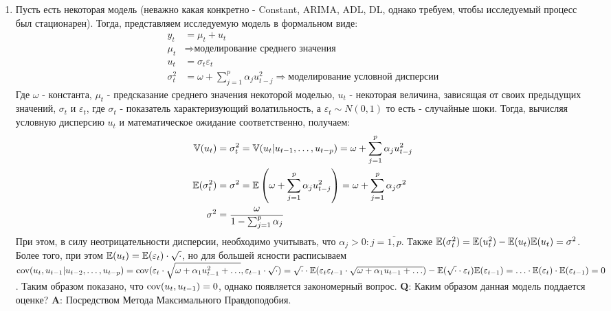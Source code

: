 \begin{enumerate}
	\item Пусть есть некоторая модель (неважно какая конкретно - Constant, ARIMA, ADL, DL, однако требуем, чтобы исследуемый процесс был стационарен). Тогда, представляем исследуемую модель в формальном виде:
	\begin{equation}
		\begin{split}
			y_t & = \mu_t + u_t\\
			\mu_t & \Rightarrow \text{моделирование среднего значения}\\
			u_t & = \sigma_t \varepsilon_t \\
			\sigma_t^2 & = \omega + \sum_{j = 1}^p \alpha_j u_{t - j}^2 \Rightarrow \text{моделирование условной дисперсии}
		\end{split}
	\end{equation}
	Где $\omega$ - константа, $\mu_t$ - предсказание среднего значения некоторой моделью, $u_t$ - некоторая величина, зависящая от своих предыдущих значений, $\sigma_t$ и $\varepsilon_{t}$, где $\sigma_t$ - показатель характеризующий волатильность, а $\varepsilon_t \sim N(0, 1)$ то есть - случайные шоки. Тогда, вычисляя условную дисперсию $u_t$ и математическое ожидание соответственно, получаем:
	\begin{equation}
		\begin{split}
			\mathbb{V}(u_t) & = \sigma^2_t  = \mathbb{V}(u_t \vert u_{t - 1}, \ldots, u_{t - p}) = \omega + \sum_{j = 1}^p \alpha_j u_{t - j}^2\\
			\mathbb{E}(\sigma^2_t) & = \sigma^2 = \mathbb{E}\left(\omega + \sum_{j = 1}^p \alpha_j u_{t - j}^2\right) = \omega + \sum_{j = 1}^p \alpha_j \sigma^2\\
			\sigma^2 & = \frac{\omega}{1 - \sum_{j = 1}^p \alpha_j}
		\end{split}
	\end{equation}
	При этом, в силу неотрицательности дисперсии, необходимо учитывать, что $\alpha_j > 0: j = \overline{1,p}$. Также $\mathbb{E}(\sigma^2_t) = \mathbb{E}(u^2_t) - \mathbb{E}(u_t)\mathbb{E}(u_t) = \sigma^2$. Более того, при этом $\mathbb{E}(u_t) = \mathbb{E}(\varepsilon_t) \cdot \sqrt{\cdot}$, но для большей ясности расписываем $\text{cov}(u_{t}, u_{t - 1} \vert u_{t - 2}, \ldots, u_{t - p}) = \text{cov}(\varepsilon_{t} \cdot \sqrt{\omega + \alpha_1 u_{t - 1}^2 + \ldots}, \varepsilon_{t - 1} \cdot \sqrt{\cdot}) = \sqrt{\cdot} \cdot \mathbb{E}(\varepsilon_{t}\varepsilon_{t - 1} \cdot \sqrt{\omega + \alpha_1 u_{t - 1} + \ldots}) - \mathbb{E}(\sqrt{\cdot} \cdot \varepsilon_{t}) \mathbb{E}(\varepsilon_{t - 1}) = \ldots \cdot \mathbb{E}(\varepsilon_{t}) \cdot \mathbb{E}(\varepsilon_{t - 1}) = 0$. Таким образом показано, что $\text{cov}(u_{t}, u_{t - 1}) = 0$, однако появляется закономерный вопрос. \textbf{Q}: Каким образом данная модель поддается оценке? \textbf{A}: Посредством Метода Максимального Правдоподобия.
	

\end{enumerate}
